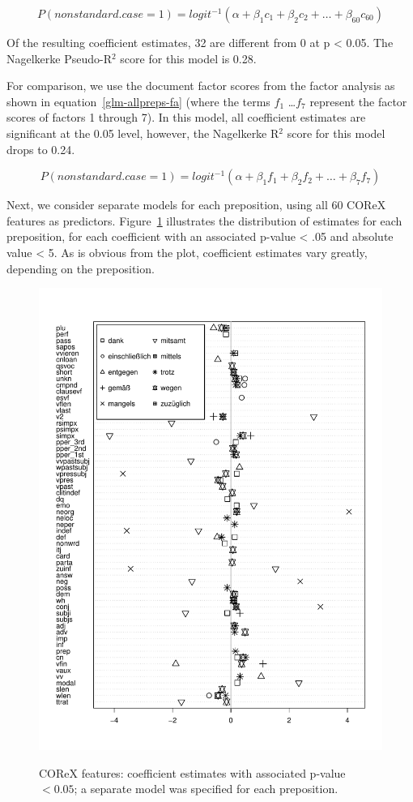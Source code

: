 \begin{equation}
\label{glm-allpreps-corex}
  P(nonstandard.case=1) = logit^{-1}(\alpha + \beta_1 c_1 + \beta_2 c_2 + \dots + \beta_{60} c_{60})
\end{equation}


Of the resulting coefficient estimates, 32 are different from 0 at p < 0.05. The Nagelkerke Pseudo-R$^2$ score for this model is 0.28.

For comparison, we use the document factor scores from the factor analysis as shown in equation~\ref{glm-allpreps-fa} (where the terms $f_1$ \ldots $f_7$ represent the factor scores of factors 1 through 7). In this model, all coefficient estimates are significant at the 0.05 level, however, the Nagelkerke R$^2$ score for this model drops to 0.24.

\begin{equation}
\label{glm-allpreps-fa}
  P(nonstandard.case=1) = logit^{-1}(\alpha + \beta_1 f_1 + \beta_2 f_2 + \dots + \beta_{7} f_{7})
\end{equation}


Next, we consider separate models for each preposition, using all 60 COReX features as predictors. Figure~\ref{coeffs-corex-individial} illustrates the distribution of estimates for each preposition, for each coefficient with an associated p-value < .05 and absolute value < 5. As is obvious from the plot, coefficient estimates vary greatly, depending on the preposition. 

\begin{figure}
  \includegraphics[scale=.9]{../R/prep-individual-coeffs-bw}
  \label{coeffs-corex-individial}
  \caption{COReX features: coefficient estimates with associated p-value $< 0.05$; a separate model was specified for each preposition.}
\end{figure}

